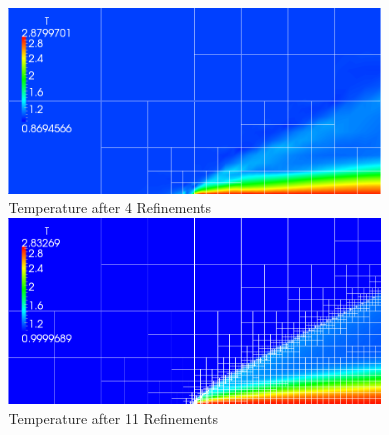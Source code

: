 \documentclass[18pt,xcolor=table]{beamer}
\begin{document}
\begin{frame}[t]
\begin{columns}
\begin{column}{0.49\textwidth}
\begin{figure}
\end{figure}
\end{column}
\begin{column}{0.49\textwidth}
\begin{figure}
\centering
\includegraphics[width=1.0\textwidth]{Motivation/PlateMovie/T4.png}\\
\vspace{-1ex}
{\scriptsize Temperature after 4 Refinements}\\
\vspace{1ex}
\includegraphics[width=1.0\textwidth]{Motivation/PlateMovie/T11.png}
\vspace{-1ex}
{\scriptsize Temperature after 11 Refinements}
\vspace{1ex}
\end{figure}
\end{column}
\end{columns}
\end{frame}
\end{document}
